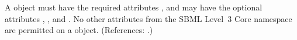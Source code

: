 A \Reaction object must have the required attributes , and may have the optional attributes
, ,  and .  No
other attributes from the SBML Level~3 Core namespace are permitted on a
\Reaction object.  (References: .)
